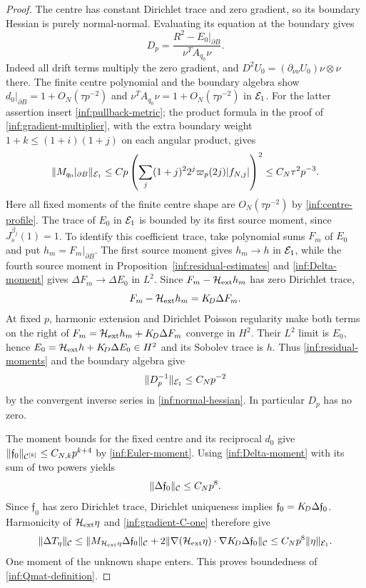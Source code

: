 \begin{proof}
The centre has constant Dirichlet trace and zero gradient, so its
boundary Hessian is purely normal-normal. Evaluating its equation
at the boundary gives
\begin{equation}\label{inf:normal-hessian}
 D_p=\frac{R^2-E_0|_{\partial B}}{\nu^TA_{q_0}\nu}.
\end{equation}
Indeed all drift terms multiply the zero gradient, and
$D^2U_0=(\partial_{\nu\nu}U_0)\nu\otimes\nu$ there.
The finite centre polynomial and the boundary algebra show
$d_0|_{\partial B}=1+O_N(\tau p^{-2})$ and
$\nu^TA_{q_0}\nu=1+O_N(\tau p^{-2})$ in $\mathcal E_1$.
For the latter assertion insert \eqref{inf:pullback-metric};
the product formula in the proof of
\eqref{inf:gradient-multiplier}, with the extra boundary weight
$1+k\le(1+i)(1+j)$ on each angular product, gives
\[
 \lVert M_{q_0}|_{\partial B}\rVert_{\mathcal E_1}
 \le Cp\left(\sum_j(1+j)^2 2^j\varpi_p(2j)|f_{N,j}|\right)^2
 \le C_N\tau^2p^{-3}.
\]
Here all fixed moments of the finite centre shape are
$O_N(\tau p^{-2})$ by \eqref{inf:centre-profile}.
The trace of $E_0$ in $\mathcal E_1$ is bounded by its first source
moment, since $J_s^{\beta_j}(1)=1$.
To identify this coefficient trace, take polynomial sums $F_m$ of
$E_0$ and put $h_m=F_m|_{\partial B}$. The first source moment
gives $h_m\to h$ in $\mathcal E_1$, while the fourth source moment in
Proposition~\ref{inf:residual-estimates} and
\eqref{inf:Delta-moment} gives $\Delta F_m\to\Delta E_0$ in $L^2$.
Since $F_m-\mathcal H_{\mathrm{ext}} h_m$ has zero Dirichlet trace,
\[
 F_m-\mathcal H_{\mathrm{ext}} h_m=K_{\!D}\Delta F_m.
\]
At fixed $p$, harmonic extension and Dirichlet Poisson regularity
make both terms on the right of
$F_m=\mathcal H_{\mathrm{ext}} h_m+K_{\!D}\Delta F_m$ converge in $H^2$.
Their $L^2$ limit is $E_0$, hence
$E_0=\mathcal H_{\mathrm{ext}} h+K_{\!D}\Delta E_0\in H^2$ and its Sobolev trace is $h$.
Thus \eqref{inf:residual-moments} and the boundary algebra give
\begin{equation}\label{inf:normal-hessian-inverse}
 \lVert D_p^{-1}\rVert_{\mathcal E_1}\le C_Np^{-2}
\end{equation}
by the convergent inverse series in \eqref{inf:normal-hessian}.
In particular $D_p$ has no zero.

The moment bounds for the fixed centre and its reciprocal $d_0$
give
$\lVert \mathfrak f_0\rVert_{\mathcal C^{[k]}}\le C_{N,k}p^{k+4}$ by
\eqref{inf:Euler-moment}.
Using \eqref{inf:Delta-moment} with its sum of two powers yields
\begin{equation}\label{inf:fixed-material-field}
 \lVert \Delta \mathfrak f_0\rVert_\mathcal C\le C_Np^8.
\end{equation}
Since $\mathfrak f_0$ has zero Dirichlet trace, Dirichlet uniqueness implies
$\mathfrak f_0=K_{\!D}\Delta \mathfrak f_0$.
Harmonicity of $\mathcal H_{\mathrm{ext}}\eta$ and
\eqref{inf:gradient-C-one} therefore give
\begin{equation}\label{inf:material-field-bound}
 \lVert \Delta T_\eta\rVert_\mathcal C
 \le\lVert M_{\mathcal H_{\mathrm{ext}}\eta}\Delta \mathfrak f_0\rVert_\mathcal C+
       2\lVert \nabla(\mathcal H_{\mathrm{ext}}\eta)\cdot\nabla K_{\!D}\Delta \mathfrak f_0\rVert_\mathcal C
 \le C_Np^8\lVert \eta\rVert_{\mathcal E_1}.
\end{equation}
One moment of the unknown shape enters. This proves
boundedness of \eqref{inf:Qmat-definition}.


\end{proof}
